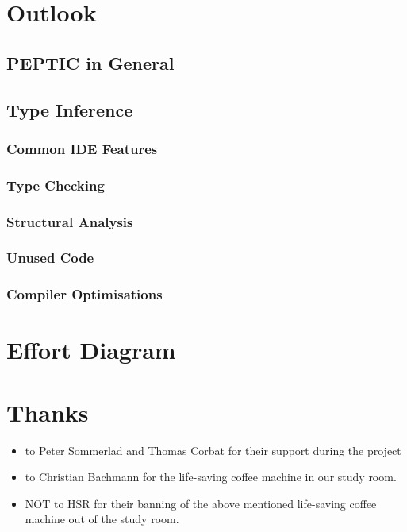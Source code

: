 \documentclass[12pt,halfparskip]{scrreprt}
\begin{document}
\section{Outlook}
\subsection{PEPTIC in General}
\subsection{Type Inference}
\subsubsection{Common IDE Features}
\subsubsection{Type Checking}
\subsubsection{Structural Analysis}
\subsubsection{Unused Code}
\subsubsection{Compiler Optimisations}

\clearpage

\section{Effort Diagram}

\clearpage

\section{Thanks}

\begin{itemize}
	\item to Peter Sommerlad and Thomas Corbat for their support during the project
	\item to Christian Bachmann for the life-saving coffee machine in our study room. 
	\item NOT to HSR for their banning of the above mentioned life-saving coffee machine out of the study room.	
\end{itemize}



\listoffigures



\end{document}
